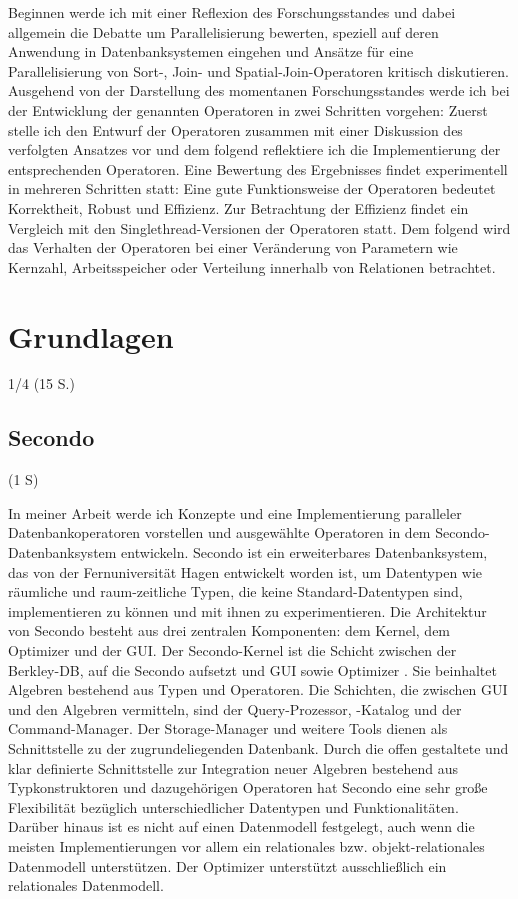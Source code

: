 \documentclass[a4paper,12pt,twoside]{article}
\begin{document}
Beginnen werde ich mit einer Reflexion des Forschungsstandes und dabei allgemein die Debatte um Parallelisierung bewerten, speziell auf deren Anwendung in Datenbanksystemen eingehen und Ansätze für eine Parallelisierung von Sort-, Join- und Spatial-Join-Operatoren kritisch diskutieren. Ausgehend von der Darstellung des momentanen Forschungsstandes werde ich bei der Entwicklung der genannten Operatoren in zwei Schritten vorgehen: Zuerst stelle ich den Entwurf der Operatoren zusammen mit einer Diskussion des verfolgten Ansatzes vor und dem folgend reflektiere ich die Implementierung der entsprechenden Operatoren. Eine Bewertung des Ergebnisses findet experimentell in mehreren Schritten statt: Eine gute Funktionsweise der Operatoren bedeutet Korrektheit, Robust und Effizienz. Zur Betrachtung der Effizienz findet ein Vergleich mit den Singlethread-Versionen der Operatoren statt. Dem folgend wird das Verhalten der Operatoren bei einer Veränderung von Parametern wie Kernzahl, Arbeitsspeicher oder Verteilung innerhalb von Relationen betrachtet.

\section{Grundlagen}
1/4 (15 S.)

\subsection{Secondo} (1 S)

In meiner Arbeit werde ich Konzepte und eine Implementierung paralleler Datenbankoperatoren vorstellen und ausgewählte Operatoren in dem Secondo-Datenbanksystem entwickeln. Secondo {\parencite{Gueting2010}} ist ein erweiterbares Datenbanksystem, das von der Fernuniversität Hagen entwickelt worden ist, um Datentypen wie räumliche und raum-zeitliche Typen, die keine Standard-Datentypen sind, implementieren zu können und mit ihnen zu experimentieren. Die Architektur von Secondo besteht aus drei zentralen Komponenten: dem Kernel, dem Optimizer und der GUI. Der Secondo-Kernel ist die Schicht zwischen der Berkley-DB, auf die Secondo aufsetzt und GUI sowie Optimizer {\parencite{Gueting2017}}. Sie beinhaltet Algebren bestehend aus Typen und Operatoren. Die Schichten, die zwischen GUI und den Algebren vermitteln, sind der Query-Prozessor, -Katalog und der Command-Manager. Der Storage-Manager und weitere Tools dienen als Schnittstelle zu der zugrundeliegenden Datenbank. Durch die offen gestaltete und klar definierte Schnittstelle zur Integration neuer Algebren bestehend aus Typkonstruktoren und dazugehörigen Operatoren hat Secondo eine sehr große Flexibilität bezüglich unterschiedlicher Datentypen und Funktionalitäten. Darüber hinaus ist es nicht auf einen Datenmodell festgelegt, auch wenn die meisten Implementierungen vor allem ein relationales bzw. objekt-relationales Datenmodell unterstützen. Der Optimizer unterstützt ausschließlich ein relationales Datenmodell. 
\end{document}

